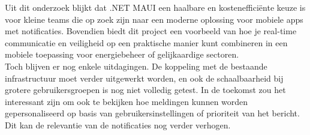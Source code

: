 Uit dit onderzoek blijkt dat .NET MAUI een haalbare en kostenefficiënte keuze is voor kleine teams die op zoek zijn naar een moderne oplossing voor mobiele apps met notificaties. Bovendien biedt dit project een voorbeeld van hoe je real-time communicatie en veiligheid op een praktische manier kunt combineren in een mobiele toepassing voor energiebeheer of gelijkaardige sectoren.\\

Toch blijven er nog enkele uitdagingen. De koppeling met de bestaande infrastructuur moet verder uitgewerkt worden, en ook de schaalbaarheid bij grotere gebruikersgroepen is nog niet volledig getest. In de toekomst zou het interessant zijn om ook te bekijken hoe meldingen kunnen worden gepersonaliseerd op basis van gebruikersinstellingen of prioriteit van het bericht. Dit kan de relevantie van de notificaties nog verder verhogen.



